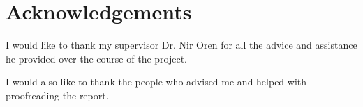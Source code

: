 \newpage
\section*{Acknowledgements}

I would like to thank my supervisor Dr. Nir Oren for all the advice and
assistance he provided over the course of the project.

I would also like to thank the people who advised me and helped with
proofreading the report.
